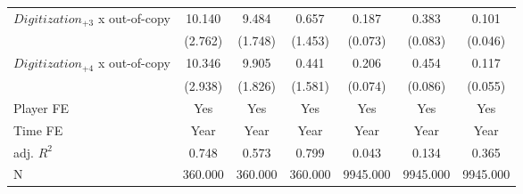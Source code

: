 {\begin{tabular*}{\hsize}{@{\hskip\tabcolsep\extracolsep\fill}l*{6}{c}}
\addlinespace
$Digitization_{+3}$ x out-of-copy&      10.140         &       9.484         &       0.657         &       0.187         &       0.383         &       0.101         \\
            &     (2.762)\sym{***}&     (1.748)\sym{***}&     (1.453)         &     (0.073)\sym{**} &     (0.083)\sym{***}&     (0.046)\sym{**} \\
\addlinespace
$Digitization_{+4}$ x out-of-copy&      10.346         &       9.905         &       0.441         &       0.206         &       0.454         &       0.117         \\
            &     (2.938)\sym{***}&     (1.826)\sym{***}&     (1.581)         &     (0.074)\sym{***}&     (0.086)\sym{***}&     (0.055)\sym{**} \\
\midrule
Player FE   &         Yes         &         Yes         &         Yes         &         Yes         &         Yes         &         Yes         \\
Time FE     &        Year         &        Year         &        Year         &        Year         &        Year         &        Year         \\
adj. $R^2$  &       0.748         &       0.573         &       0.799         &       0.043         &       0.134         &       0.365         \\
N           &     360.000         &     360.000         &     360.000         &    9945.000         &    9945.000         &    9945.000         \\
\bottomrule
\end{tabular*}
}
